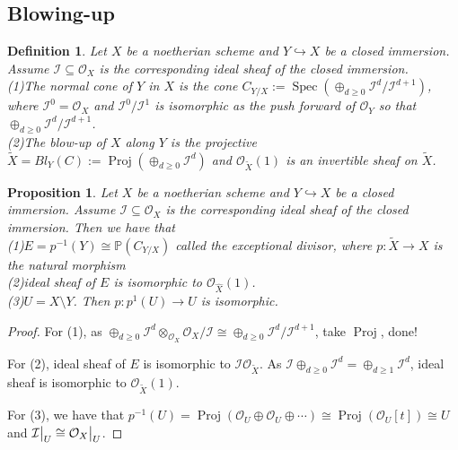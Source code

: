 \documentclass{ctexart}
\newtheorem{definition}{Definition}[section]
\newtheorem{proposition}{Proposition}[section]
\newcommand{\spec}{\operatorname{Spec}}
\newcommand{\proj}{\operatorname{Proj}}
\begin{document}
\subsection{Blowing-up}
\begin{definition}
    Let $X$ be a noetherian scheme and $Y \hookrightarrow X$ be a closed immersion.
    Assume $\mathcal{I} \subseteq \mathcal{O}_{X}$ is the corresponding ideal sheaf of the closed immersion. \\
    (1)The normal cone of $Y$ in $X$ is the cone $C_{Y/X} := \spec(\oplus_{d \ge 0} \mathcal{I}^{d}/\mathcal{I}^{d + 1})$,
    where $\mathcal{I}^{0} = \mathcal{O}_{X}$ and $\mathcal{I}^{0}/\mathcal{I}^{1}$ is isomorphic as the push forward of $\mathcal{O}_{Y}$ so that $\oplus_{d \ge 0} \mathcal{I}^{d}/\mathcal{I}^{d + 1}$. \\
    (2)The blow-up of $X$ along $Y$ is the projective $\widetilde{X} = Bl_{Y}(C) := \proj(\oplus_{d \ge 0} \mathcal{I}^{d})$ and $\mathcal{O}_{\widetilde{X}}(1)$ is an invertible sheaf on $\widetilde{X}$.
\end{definition} 
\begin{proposition}
    Let $X$ be a noetherian scheme and $Y \hookrightarrow X$ be a closed immersion.
    Assume $\mathcal{I} \subseteq \mathcal{O}_{X}$ is the corresponding ideal sheaf of the closed immersion.
    Then we have that \\
    (1)$E = p^{-1}(Y) \cong \mathbb{P}(C_{Y/X})$ called the exceptional divisor,
    where $p: \widetilde{X} \longrightarrow X$ is the natural morphism \\
    (2)ideal sheaf of $E$ is isomorphic to $\mathcal{O}_{\widehat{X}}(1)$. \\
    (3)$U = X \setminus Y$.
    Then $p: p^{1}(U) \longrightarrow U$ is isomorphic.
    \label{Proposition 10.1}
\end{proposition}
\begin{proof}
    For (1), as $\oplus_{d \ge 0} \mathcal{I}^{d} \otimes_{\mathcal{O}_{X}} \mathcal{O}_{X}/\mathcal{I} \cong \oplus_{d \ge 0} \mathcal{I}^{d}/\mathcal{I}^{d + 1}$, take $\proj$, done! 
    \par
    For (2), ideal sheaf of $E$ is isomorphic to $\mathcal{I}\mathcal{O}_{\widetilde{X}}$.
    As $\mathcal{I}\oplus_{d \ge 0} \mathcal{I}^{d} = \oplus_{d \ge 1} \mathcal{I}^{d}$, ideal sheaf is isomorphic to $\mathcal{O}_{\widetilde{X}}(1)$. 
    \par
    For (3), we have that $p^{-1}(U) = \proj(\mathcal{O}_{U} \oplus \mathcal{O}_{U} \oplus \cdots) \cong \proj(\mathcal{O}_{U}[t]) \cong U$ and $\mathcal{I}\big{|}_{U} \cong \mathcal{O}_{X}\big{|}_{U}$.
\end{proof}
\end{document}
